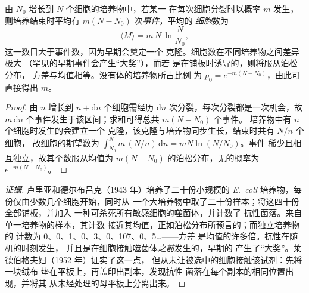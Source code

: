 \begin{theorem}[生长培养物中的突变体]\label{thm:b2:genome-diversification:luria}
由 $N_0$ 增长到 $N$ 个细胞的培养物中，若某一
在每次细胞分裂时以概率 $m$ 发生，则培养结束时平均有
$m(N - N_0)$ 次\emph{事件}，平均的
\emph{细胞}数为
\[
\langle M\rangle = m\,N\,\ln\frac{N}{N_0},
\]
这一数目大于事件数，因为早期会奠定一个
克隆。细胞数在不同培养物之间差异极大
（罕见的早期事件会产生“大奖”），而若
是在铺板时诱导的，则将服从泊松分布，
方差与均值相等。没有体的培养物所占比例
为 $p_0 = e^{-m(N - N_0)}$，由此可直接得出 $m$。
\end{theorem}
\begin{proof}
由 $n$ 增长到 $n + \mathrm{d}n$ 个细胞需经历 $\mathrm{d}n$
次分裂，每次分裂都是一次机会，故 $m\,\mathrm{d}n$
个事件发生于该区间；求和可得总共 $m(N - N_0)$ 个事件。
培养物中有 $n$ 个细胞时发生的会建立一个
克隆，该克隆与培养物同步生长，结束时共有 $N/n$ 个细胞，
故细胞的期望数为
$\int_{N_0}^{N} m\,(N/n)\,\mathrm{d}n = mN\ln(N/N_0)$。事件
稀少且相互独立，故其个数服从均值为
$m(N - N_0)$ 的泊松分布，无的概率为 $e^{-m(N - N_0)}$。
\end{proof}
\begin{proof}[证据]
卢里亚和德尔布吕克（1943 年）培养了二十份小规模的
\emph{E.~coli} 培养物，每份仅由少数几个细胞开始，同时从
一个大培养物中取了二十份样本；将这四十份全部铺板，并加入
一种可杀死所有敏感细胞的噬菌体，并计数了
抗性菌落。来自单一培养物的样本，其计数
接近其均值，正如泊松分布所预言的；而独立培养物的
计数为 0、0、1、0、3、0、107、0、5\dots{}——方差
是均值的许多倍。抗性在随机的时刻发生，
并且是在细胞接触噬菌体\emph{之前}发生的，早期的
产生了“大奖”。莱德伯格夫妇（1952 年）证实了这一点，
但从未让被选中的细胞接触该试剂：先将一块绒布
垫在平板上，再盖印出副本，发现抗性
菌落在每个副本的相同位置出现，并将其
从未经处理的母平板上分离出来。
\end{proof}

